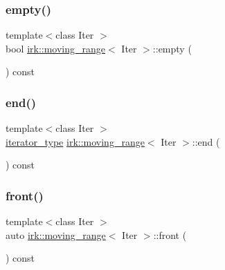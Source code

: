 \subsubsection{\texorpdfstring{empty()}{empty()}}
{\footnotesize\ttfamily template$<$class Iter $>$ \\
bool \mbox{\hyperlink{structirk_1_1moving__range}{irk\+::moving\+\_\+range}}$<$ Iter $>$\+::empty (\begin{DoxyParamCaption}{ }\end{DoxyParamCaption}) const\hspace{0.3cm}{\ttfamily [inline]}}

\mbox{\label{structirk_1_1moving__range_ad904d898c5132ebb7d6f479db591d093}} 
\subsubsection{\texorpdfstring{end()}{end()}}
{\footnotesize\ttfamily template$<$class Iter $>$ \\
\mbox{\hyperlink{structirk_1_1moving__range_ad77e99c581516edfaae4cdb3cc6793ba}{iterator\+\_\+type}} \mbox{\hyperlink{structirk_1_1moving__range}{irk\+::moving\+\_\+range}}$<$ Iter $>$\+::end (\begin{DoxyParamCaption}{ }\end{DoxyParamCaption}) const\hspace{0.3cm}{\ttfamily [inline]}}

\mbox{\label{structirk_1_1moving__range_a10d1586db8a0f1cca48e27ca0cc4b2a9}} 
\subsubsection{\texorpdfstring{front()}{front()}}
{\footnotesize\ttfamily template$<$class Iter $>$ \\
auto \mbox{\hyperlink{structirk_1_1moving__range}{irk\+::moving\+\_\+range}}$<$ Iter $>$\+::front (\begin{DoxyParamCaption}{ }\end{DoxyParamCaption}) const\hspace{0.3cm}{\ttfamily [inline]}}



